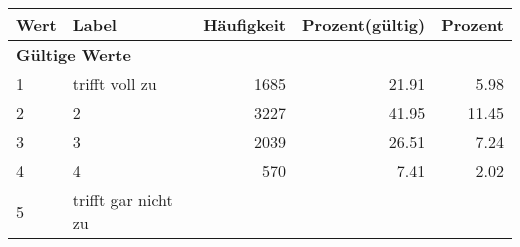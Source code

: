      \begin{longtable}{lXrrr}
     \toprule
     \textbf{Wert} & \textbf{Label} & \textbf{Häufigkeit} & \textbf{Prozent(gültig)} & \textbf{Prozent} \\
     \endhead
     \midrule
     \multicolumn{5}{l}{\textbf{Gültige Werte}}\\

     1 &
     \multicolumn{1}{X}{ trifft voll zu   } &


       \num{1685} &
       \num[round-mode=places,round-precision=2]{21,91} &
         \num[round-mode=places,round-precision=2]{5,98} \\

     2 &
     \multicolumn{1}{X}{ 2   } &


       \num{3227} &
       \num[round-mode=places,round-precision=2]{41,95} &
         \num[round-mode=places,round-precision=2]{11,45} \\

     3 &
     \multicolumn{1}{X}{ 3   } &


       \num{2039} &
       \num[round-mode=places,round-precision=2]{26,51} &
         \num[round-mode=places,round-precision=2]{7,24} \\

     4 &
     \multicolumn{1}{X}{ 4   } &


       \num{570} &
       \num[round-mode=places,round-precision=2]{7,41} &
         \num[round-mode=places,round-precision=2]{2,02} \\

     5 &
     \multicolumn{1}{X}{ trifft gar nicht zu   } &



\end{longtable}

